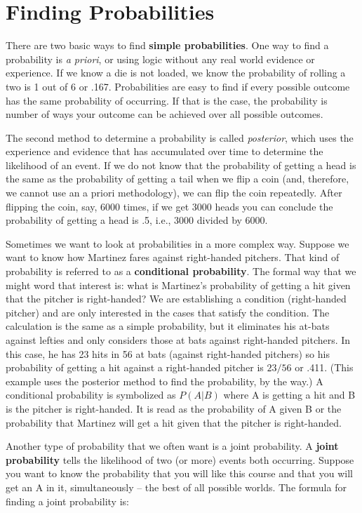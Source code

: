\documentclass[11pt,openany]{book}\usepackage[]{graphicx}\usepackage[]{color}
\begin{document}
{\section{Finding Probabilities}

There are two basic ways to find \textbf{simple probabilities}.  One way to find a probability is \textit{a priori}, or using logic without any real world evidence or experience.  If we know a die is not loaded, we know the probability of rolling a two is 1 out of 6 or .167.  Probabilities are easy to find if every possible outcome has the same probability of occurring.  If that is the case, the probability is number of ways your outcome can be achieved over all possible outcomes.  

The second method to determine a probability is called \textit{posterior}, which uses the experience and evidence that has accumulated over time to determine the likelihood of an event.  If we do not know that the probability of getting a head is the same as the probability of getting a tail when we flip a coin (and, therefore, we cannot use an a priori methodology), we can flip the coin repeatedly.  After flipping the coin, say, 6000 times, if we get 3000 heads you can conclude the probability of getting a head is .5, i.e., 3000 divided by 6000.
  
Sometimes we want to look at probabilities in a more complex way.  Suppose we want to know how Martinez fares against right-handed pitchers.  That kind of probability is referred to as a \textbf{conditional probability}.  The formal way that we might word that interest is: what is Martinez's probability of getting a hit given that the pitcher is right-handed?  We are establishing a condition (right-handed pitcher) and are only interested in the cases that satisfy the condition.  The calculation is the same as a simple probability, but it eliminates his at-bats against lefties and only considers those at bats against right-handed pitchers.   In this case, he has 23 hits in 56 at bats (against right-handed pitchers) so his probability of getting a hit against a right-handed pitcher is $23/56$ or .411.  (This example uses the posterior method to find the probability, by the way.)  A conditional probability is symbolized as $P(A|B)$ where A is getting a hit and B is the pitcher is right-handed.  It is read as the probability of A given B or the probability that Martinez will get a hit given that the pitcher is right-handed.

Another type of probability that we often want is a joint probability.  A \textbf{joint probability} tells the likelihood of two (or more) events both occurring.   Suppose you want to know the probability that you will like this course and that you will get an A in it, simultaneously -- the best of all possible worlds.   The formula for finding a joint probability is:

}
\end{document}
